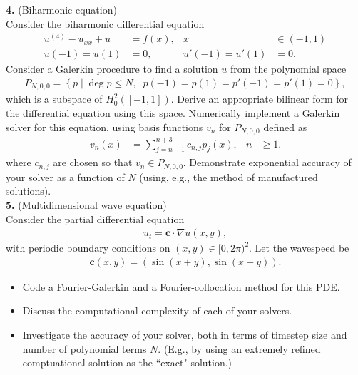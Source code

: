 \documentclass[11pt]{amsart}
\begin{document}
\textbf{4.} (Biharmonic equation)\\
Consider the biharmonic differential equation
  {\begin{align*}
    u^{(4)} - u_{x x} + u &= f(x), & x &\in (-1,1) \\
    u(-1) = u(1) &= 0, & u'(-1) = u'(1) &= 0.
  \end{align*}}
  Consider a Galerkin procedure to find a solution $u$ from the polynomial space
  \begin{align*}
    P_{N,0,0} = \left\{ p\; \big|\; \deg p \leq N, \;\; p(-1) = p(1) = p'(-1) = p'(1) = 0\right\},
  \end{align*}
  which is a subspace of $H_0^2([-1,1])$. Derive an appropriate bilinear form for the differential equation using this space. Numerically implement a Galerkin solver for this equation, using basis functions $v_n$ for $P_{N,0,0}$ defined as
  {\begin{align*}
      v_n(x) &= \sum_{j=n-1}^{n+3} c_{n,j} p_{j}(x), & n &\geq 1.
  \end{align*}}
  where $c_{n,j}$ are chosen so that $v_n \in P_{N,0,0}$. Demonstrate exponential accuracy of your solver as a function of $N$ (using, e.g., the method of manufactured solutions).\\[12pt]


\textbf{5.} (Multidimensional wave equation)\\
Consider the partial differential equation
  {\begin{align*}
      u_t = \boldsymbol{c} \cdot \nabla u(x,y),
    \end{align*}
  }
  with periodic boundary conditions on $(x,y) \in [0, 2\pi)^2$. Let the wavespeed be
    {
    \begin{align*}
      \boldsymbol{c}(x,y) = \left( \sin (x + y) , \sin (x - y) \right).
    \end{align*}
  }
  \begin{itemize}
    \item Code a Fourier-Galerkin and a Fourier-collocation method for this PDE.
    \item Discuss the computational complexity of each of your solvers.
    \item Investigate the accuracy of your solver, both in terms of timestep size and number of polynomial terms $N$. (E.g., by using an extremely refined comptuational solution as the ``exact" solution.)
  \end{itemize}
  \vskip 10pt
\end{document}
